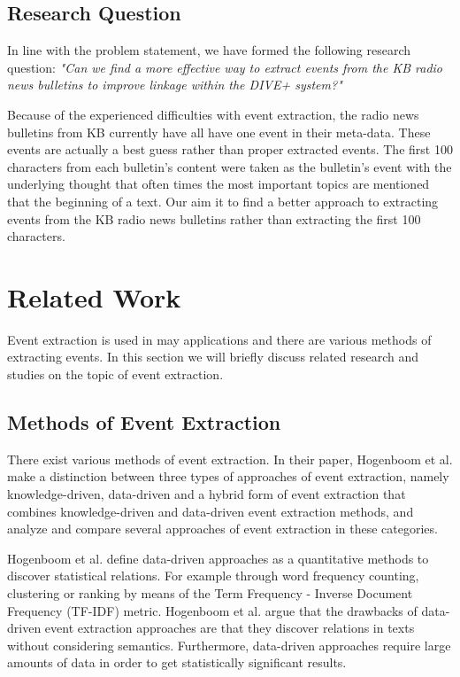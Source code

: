 \documentclass[a4paper, 10pt, conference]{ieeeconf}      %
\begin{document}
\subsection{Research Question}
In line with the problem statement, we have formed the following research question: \textit{"Can we find a more effective way to extract events from the KB radio news bulletins to improve linkage within the DIVE+ system?"}

Because of the experienced difficulties with event extraction, the radio news bulletins from KB currently have all have one event in their meta-data. These events are actually a best guess rather than proper extracted events. The first 100 characters from each bulletin's content were taken as the bulletin's event with the underlying thought that often times the most important topics are mentioned that the beginning of a text. Our aim it to find a better approach to extracting events from the KB radio news bulletins rather than extracting the first 100 characters.

\section{Related Work}
Event extraction is used in may applications and there are various methods of extracting events. In this section we will briefly discuss related research and studies on the topic of event extraction.

\subsection{Methods of Event Extraction}\label{related work methods}
There exist various methods of event extraction. In their paper, Hogenboom et al.\cite{hogenboom2011overview} make a distinction between three types of approaches of event extraction, namely knowledge-driven, data-driven and a hybrid form of event extraction that combines knowledge-driven and data-driven event extraction methods, and analyze and compare several approaches of event extraction in these categories. 

Hogenboom et al. define data-driven approaches as a quantitative methods to discover statistical relations. For example through word frequency counting, clustering or ranking by means of the Term Frequency - Inverse Document Frequency (TF-IDF) metric. Hogenboom et al. argue that the drawbacks of data-driven event extraction approaches are that they discover relations in texts without considering semantics. Furthermore, data-driven approaches require large amounts of data in order to get statistically significant results.
\end{document}
